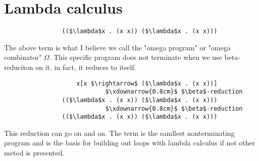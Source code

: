 \section{Lambda calculus}
\begin{lstlisting}
                (($\lambda$x . (x x)) ($\lambda$x . (x x)))
\end{lstlisting}

The above term is what I believe we call the "omega program" or "omega combinator" $\Omega$.
This specific program does not terminate when we use beta-reduciton on it.
in fact, it reduces to itself.

\begin{lstlisting}
                    x[x $\rightarrow$ ($\lambda$x . (x x))]
                            $\xdownarrow{0.8cm}$ $\beta$-reduction 
                (($\lambda$x . (x x)) ($\lambda$x . (x x)))
                            $\xdownarrow{0.8cm}$ $\beta$-reduction 
                (($\lambda$x . (x x)) ($\lambda$x . (x x)))
\end{lstlisting}

This reduction can go on and on. The term is the samllest nonterminating program
and is the basis for building out loops with lambda calculus if not other metod
is presented.
